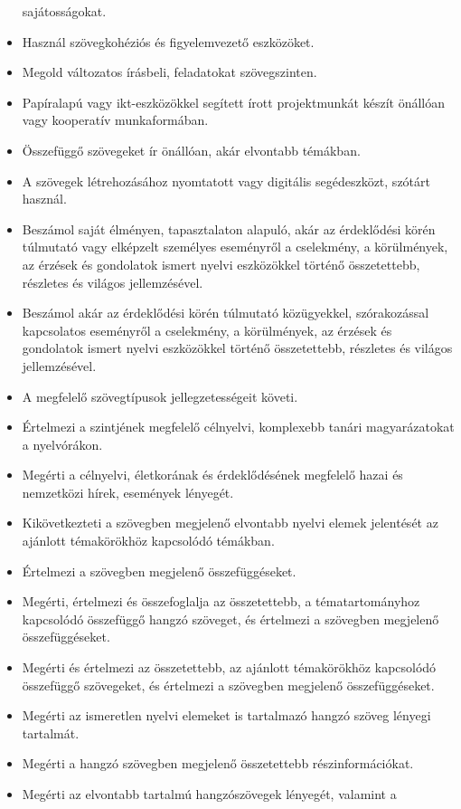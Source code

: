 \begin{itemize}
  sajátosságokat.
\item
  Használ szövegkohéziós és figyelemvezető eszközöket.
\item
  Megold változatos írásbeli, feladatokat szövegszinten.
\item
  Papíralapú vagy ikt-eszközökkel segített írott projektmunkát készít
  önállóan vagy kooperatív munkaformában.
\item
  Összefüggő szövegeket ír önállóan, akár elvontabb témákban.
\item
  A szövegek létrehozásához nyomtatott vagy digitális segédeszközt,
  szótárt használ.
\item
  Beszámol saját élményen, tapasztalaton alapuló, akár az érdeklődési
  körén túlmutató vagy elképzelt személyes eseményről a cselekmény, a
  körülmények, az érzések és gondolatok ismert nyelvi eszközökkel
  történő összetettebb, részletes és világos jellemzésével.
\item
  Beszámol akár az érdeklődési körén túlmutató közügyekkel,
  szórakozással kapcsolatos eseményről a cselekmény, a körülmények, az
  érzések és gondolatok ismert nyelvi eszközökkel történő összetettebb,
  részletes és világos jellemzésével.
\item
  A megfelelő szövegtípusok jellegzetességeit követi.
\item
  Értelmezi a szintjének megfelelő célnyelvi, komplexebb tanári
  magyarázatokat a nyelvórákon.
\item
  Megérti a célnyelvi, életkorának és érdeklődésének megfelelő hazai és
  nemzetközi hírek, események lényegét.
\item
  Kikövetkezteti a szövegben megjelenő elvontabb nyelvi elemek
  jelentését az ajánlott témakörökhöz kapcsolódó témákban.
\item
  Értelmezi a szövegben megjelenő összefüggéseket.
\item
  Megérti, értelmezi és összefoglalja az összetettebb, a
  tématartományhoz kapcsolódó összefüggő hangzó szöveget, és értelmezi a
  szövegben megjelenő összefüggéseket.
\item
  Megérti és értelmezi az összetettebb, az ajánlott témakörökhöz
  kapcsolódó összefüggő szövegeket, és értelmezi a szövegben megjelenő
  összefüggéseket.
\item
  Megérti az ismeretlen nyelvi elemeket is tartalmazó hangzó szöveg
  lényegi tartalmát.
\item
  Megérti a hangzó szövegben megjelenő összetettebb részinformációkat.
\item
  Megérti az elvontabb tartalmú hangzószövegek lényegét, valamint a

\end{itemize}
